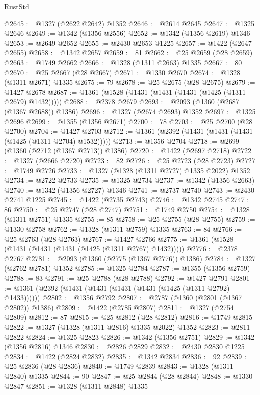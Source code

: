 \begin{lexlean}{RustStd}
\begin{coremodule}
@2645 := @1327 (@2622 @2642) @1352
@2646 := @2614 @2645
@2647 := @1325 @2646
@2649 := @1342 (@1356 @2556)
@2652 := @1342 (@1356 @2619) @1346
@2653 := @2649 @2652
@2655 := @2430 @2653 @1225
@2657 := @1422 (@2647 @2655)
@2658 := @1342 @2657
@2659 := 81
@2662 := @25 @2659 (@28 @2659)
@2663 := @1749 @2662
@2666 := @1328 (@1311 @2663) @1335
@2667 := 80
@2670 := @25 @2667 (@28 @2667)
@2671 := @1330 @2670
@2674 := @1328 (@1311 @2671) @1335
@2675 := 79
@2678 := @25 @2675 (@28 @2675)
@2679 := @1427 @2678
@2687 := @1361 (@1528 (@1431 (@1431 (@1431 (@1425 (@1311 @2679) @1432)))))
@2688 := @2378 @2679
@2693 := @2093 (@1360 (@2687 (@1367 @2688)) @1386)
@2696 := @1327 (@2674 @2693) @1352
@2697 := @1325 @2696
@2699 := @1355 (@1356 @2671)
@2700 := 78
@2703 := @25 @2700 (@28 @2700)
@2704 := @1427 @2703
@2712 := @1361 (@2392 (@1431 (@1431 (@1431 (@1425 (@1311 @2704) @1532)))))
@2713 := @1356 @2704
@2718 := @2699 (@1360 (@2712 (@1367 @2713)) @1386)
@2720 := @1422 (@2697 @2718)
@2722 := @1327 (@2666 @2720)
@2723 := 82
@2726 := @25 @2723 (@28 @2723)
@2727 := @1749 @2726
@2733 := @1327 (@1328 (@1311 @2727) @1335 @2022) @1352
@2734 := @2722 @2733
@2735 := @1325 @2734
@2737 := @1342 (@1356 @2663)
@2740 := @1342 (@1356 @2727) @1346
@2741 := @2737 @2740
@2743 := @2430 @2741 @1225
@2745 := @1422 (@2735 @2743)
@2746 := @1342 @2745
@2747 := 86
@2750 := @25 @2747 (@28 @2747)
@2751 := @1749 @2750
@2754 := @1328 (@1311 @2751) @1335
@2755 := 85
@2758 := @25 @2755 (@28 @2755)
@2759 := @1330 @2758
@2762 := @1328 (@1311 @2759) @1335
@2763 := 84
@2766 := @25 @2763 (@28 @2763)
@2767 := @1427 @2766
@2775 := @1361 (@1528 (@1431 (@1431 (@1431 (@1425 (@1311 @2767) @1432)))))
@2776 := @2378 @2767
@2781 := @2093 (@1360 (@2775 (@1367 @2776)) @1386)
@2784 := @1327 (@2762 @2781) @1352
@2785 := @1325 @2784
@2787 := @1355 (@1356 @2759)
@2788 := 83
@2791 := @25 @2788 (@28 @2788)
@2792 := @1427 @2791
@2801 := @1361 (@2392 (@1431 (@1431 (@1431 (@1431 (@1425 (@1311 @2792) @1433))))))
@2802 := @1356 @2792
@2807 := @2787 (@1360 (@2801 (@1367 @2802)) @1386)
@2809 := @1422 (@2785 @2807)
@2811 := @1327 (@2754 @2809)
@2812 := 87
@2815 := @25 @2812 (@28 @2812)
@2816 := @1749 @2815
@2822 := @1327 (@1328 (@1311 @2816) @1335 @2022) @1352
@2823 := @2811 @2822
@2824 := @1325 @2823
@2826 := @1342 (@1356 @2751)
@2829 := @1342 (@1356 @2816) @1346
@2830 := @2826 @2829
@2832 := @2430 @2830 @1225
@2834 := @1422 (@2824 @2832)
@2835 := @1342 @2834
@2836 := 92
@2839 := @25 @2836 (@28 @2836)
@2840 := @1749 @2839
@2843 := @1328 (@1311 @2840) @1335
@2844 := 90
@2847 := @25 @2844 (@28 @2844)
@2848 := @1330 @2847
@2851 := @1328 (@1311 @2848) @1335

\end{coremodule}
\end{lexlean}
